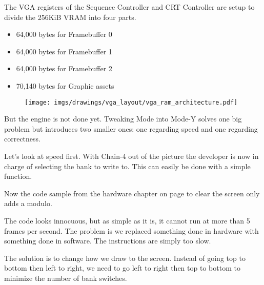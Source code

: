 \documentclass[book.tex]{subfiles}
\begin{document}
 \par
 The VGA registers of the Sequence Controller and CRT Controller are setup to divide the 256KiB VRAM into four parts.
 \begin{itemize}\label{SetupPages}
 \item 64,000 bytes for Framebuffer 0
 \item 64,000 bytes for Framebuffer 1
 \item 64,000 bytes for Framebuffer 2
 \item 70,140 bytes for Graphic assets
\end{itemize}
\par
\begin{figure}[H]
\centering
 \texttt{[image: imgs/drawings/vga\_layout/vga\_ram\_architecture.pdf]}
 \end{figure}
\par
But the engine is not done yet. Tweaking Mode  into Mode-Y solves one big problem but introduces two smaller ones: one regarding speed and one regarding correctness.\\
\par
Let's look at speed first. With Chain-4 out of the picture the developer is now in charge of selecting the bank to write to. This can easily be done with a simple function.\\
\par
 \par
 \begin{minipage}{\textwidth}

\end{minipage}
 \par

Now the code sample from the hardware chapter on page \pageref{clearvga} to clear the screen only adds a modulo.\\
\par
\par
\begin{minipage}{\textwidth}

\end{minipage}
\par
The code looks innocuous, but as simple as it is, it cannot run at more than 5 frames per second. The problem is we replaced something done in hardware with something done in software. The  instructions are simply too slow.\\
\par
The solution is to change how we draw to the screen. Instead of going top to bottom then left to right, we need to go left to right then top to bottom to minimize the number of bank switches.\\
\par
\begin{minipage}{\textwidth}

\end{minipage}
\end{document}
